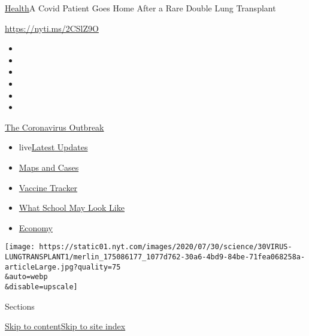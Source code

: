 \href{/section/health}{Health}\textbar{}A Covid Patient Goes Home After
a Rare Double Lung Transplant

\url{https://nyti.ms/2CSlZ9O}

\begin{itemize}
\item
\item
\item
\item
\item
\item
\end{itemize}

\href{https://www.nytimes.com/news-event/coronavirus?action=click\&pgtype=Article\&state=default\&region=TOP_BANNER\&context=storylines_menu}{The
Coronavirus Outbreak}

\begin{itemize}
\tightlist
\item
  live\href{https://www.nytimes.com/2020/08/01/world/coronavirus-covid-19.html?action=click\&pgtype=Article\&state=default\&region=TOP_BANNER\&context=storylines_menu}{Latest
  Updates}
\item
  \href{https://www.nytimes.com/interactive/2020/us/coronavirus-us-cases.html?action=click\&pgtype=Article\&state=default\&region=TOP_BANNER\&context=storylines_menu}{Maps
  and Cases}
\item
  \href{https://www.nytimes.com/interactive/2020/science/coronavirus-vaccine-tracker.html?action=click\&pgtype=Article\&state=default\&region=TOP_BANNER\&context=storylines_menu}{Vaccine
  Tracker}
\item
  \href{https://www.nytimes.com/interactive/2020/07/29/us/schools-reopening-coronavirus.html?action=click\&pgtype=Article\&state=default\&region=TOP_BANNER\&context=storylines_menu}{What
  School May Look Like}
\item
  \href{https://www.nytimes.com/live/2020/07/31/business/stock-market-today-coronavirus?action=click\&pgtype=Article\&state=default\&region=TOP_BANNER\&context=storylines_menu}{Economy}
\end{itemize}

\texttt{[image: https://static01.nyt.com/images/2020/07/30/science/30VIRUS-LUNGTRANSPLANT1/merlin\_175086177\_1077d762-30a6-4bd9-84be-71fea068258a-articleLarge.jpg?quality=75\\\&auto=webp\\\&disable=upscale]}

Sections

\protect\hyperlink{site-content}{Skip to
content}\protect\hyperlink{site-index}{Skip to site index}

